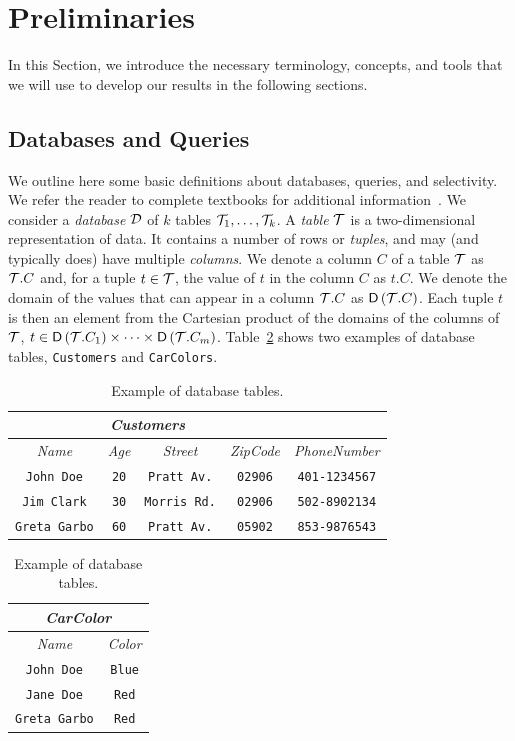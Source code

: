 \section{Preliminaries}\label{sec:prelims}
In this Section, we introduce the necessary terminology, concepts, and tools
that we will use to develop our results in the following sections.

\subsection{Databases and Queries}\label{sec:dbqueries}
We outline here some basic definitions about databases, queries, and
selectivity. We refer the reader to complete textbooks for additional
information~\citep{GarciaMolinaUW02}.
We consider a \emph{database} ${\cal D}$ of $k$ tables ${\cal T}_1,\dotsc,{\cal T}_k$. 
A \emph{table} ${\cal T}$ is a two-dimensional representation of data. It
contains a number of rows or \emph{tuples}, and may (and typically does) have multiple
\emph{columns}. We denote a column $C$ of a table ${\cal T}$ as ${\cal T}.C$ and, for a
tuple $t\in{\cal T}$, the value of $t$ in the column $C$ as $t.C$. We denote the
domain of the values that can appear in a column ${\cal T}.C$ as $\mathsf{D}\left({\cal T}.C\right)$.
Each tuple $t$ is then an element from the Cartesian product of the domains of
the columns of ${\cal T}$, $t\in \mathsf{D}\left({\cal T}.C_1\right)\times\dotsb\times
\mathsf{D}\left({\cal T}.C_m\right)$. Table~\ref{tab:example} shows two examples of database
tables, \texttt{Customers} and \texttt{CarColors}. 

\begin{table}[htb]
  \centering
  \begin{tabular}{c|c|c|c|c}
    \multicolumn{4}{c}{\emph{Customers}} \\
    \midrule
    \emph{Name} & \emph{Age} & \emph{Street} & \emph{ZipCode} & \emph{PhoneNumber} \\
    \midrule
    \texttt{John Doe} & \texttt{20} & \texttt{Pratt Av.} & \texttt{02906} & \texttt{401-1234567} \\
    \texttt{Jim Clark} &  \texttt{30} &\texttt{Morris Rd.} & \texttt{02906} & \texttt{502-8902134} \\
    \texttt{Greta Garbo} & \texttt{60} & \texttt{Pratt Av.} & \texttt{05902} & \texttt{853-9876543} \\
    \bottomrule
  \end{tabular}
  \hfill
  \begin{tabular}{c|c}
    \multicolumn{2}{c}{\emph{CarColor}} \\
    \midrule
    \emph{Name} & \emph{Color} \\
    \midrule
    \texttt{John Doe} & \texttt{Blue} \\
    \texttt{Jane Doe} & \texttt{Red} \\
    \texttt{Greta Garbo} & \texttt{Red}\\ 
    \bottomrule
  \end{tabular}
  \caption{Example of database tables.}
  \label{tab:example}
\end{table}

